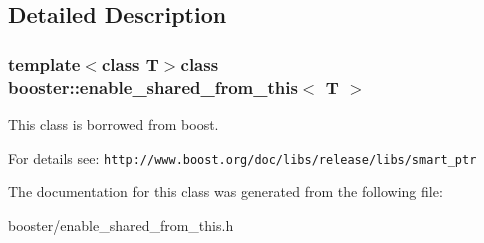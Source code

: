 \subsection{Detailed Description}
\subsubsection*{template$<$class T$>$class booster\-::enable\-\_\-shared\-\_\-from\-\_\-this$<$ T $>$}

This class is borrowed from boost. 

For details see\-: {\tt http\-://www.\-boost.\-org/doc/libs/release/libs/smart\-\_\-ptr} 

The documentation for this class was generated from the following file\-:\begin{DoxyCompactItemize}
\item 
booster/enable\-\_\-shared\-\_\-from\-\_\-this.\-h\end{DoxyCompactItemize}
